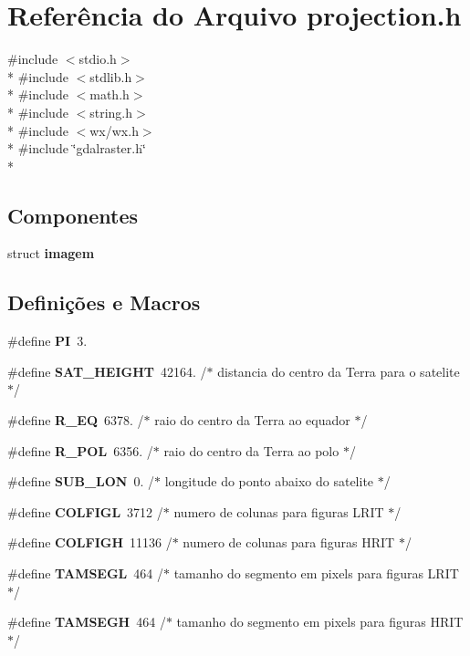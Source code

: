 \section{Referência do Arquivo projection.\+h}
\label{projection_8h}
{\ttfamily \#include $<$stdio.\+h$>$}\\*
{\ttfamily \#include $<$stdlib.\+h$>$}\\*
{\ttfamily \#include $<$math.\+h$>$}\\*
{\ttfamily \#include $<$string.\+h$>$}\\*
{\ttfamily \#include $<$wx/wx.\+h$>$}\\*
{\ttfamily \#include \char`\"{}gdalraster.\+h\char`\"{}}\\*
\subsection*{Componentes}
\begin{DoxyCompactItemize}
\item 
struct {\bf imagem}
\end{DoxyCompactItemize}
\subsection*{Definições e Macros}
\begin{DoxyCompactItemize}
\item 
\#define {\bf PI}~3.
\item 
\#define {\bf S\+A\+T\+\_\+\+H\+E\+I\+G\+HT}~42164.             /$\ast$ distancia do centro da Terra para o satelite     $\ast$/
\item 
\#define {\bf R\+\_\+\+EQ}~6378.           /$\ast$ raio do centro da Terra ao equador               $\ast$/
\item 
\#define {\bf R\+\_\+\+P\+OL}~6356.          /$\ast$ raio do centro da Terra ao polo                  $\ast$/
\item 
\#define {\bf S\+U\+B\+\_\+\+L\+ON}~0.             /$\ast$ longitude do ponto abaixo do satelite            $\ast$/
\item 
\#define {\bf C\+O\+L\+F\+I\+GL}~3712               /$\ast$ numero de colunas para figuras L\+R\+IT              $\ast$/
\item 
\#define {\bf C\+O\+L\+F\+I\+GH}~11136               /$\ast$ numero de colunas para figuras H\+R\+IT              $\ast$/
\item 
\#define {\bf T\+A\+M\+S\+E\+GL}~464               /$\ast$ tamanho do segmento em pixels para figuras L\+R\+IT  $\ast$/
\item 
\#define {\bf T\+A\+M\+S\+E\+GH}~464               /$\ast$ tamanho do segmento em pixels para figuras H\+R\+IT  $\ast$/
\end{DoxyCompactItemize}
